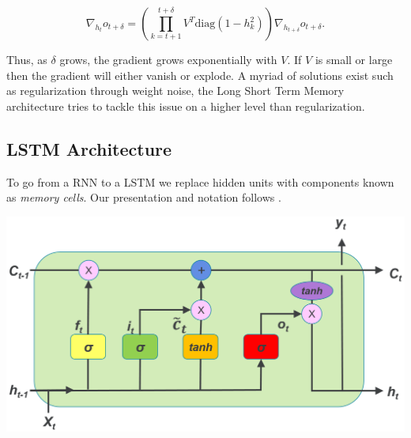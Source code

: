 \documentclass{article}
\begin{document}
\begin{equation*}
  \nabla_{h_t} o_{t + \delta} = \left( \prod_{k = t+1}^{t+\delta} V^T
  \text{diag}(1 - h^2_k) \right)\nabla_{h_{t + \delta}}o_{t + \delta}.
\end{equation*}

Thus, as $\delta$ grows, the gradient grows exponentially with $V$. If $V$ is
small or large then the gradient will either vanish or explode. A myriad
of solutions exist such as regularization through weight noise, the Long Short
Term Memory architecture tries to tackle this issue on a higher level than
regularization.
\subsection{LSTM Architecture}
To go from a RNN to a LSTM we replace hidden units with components known as
\textit{memory cells}. Our presentation and notation follows \cite{revieww}.
\begin{center}
    \includegraphics[width =\columnwidth]{lstm.png}
\end{center}
\end{document}

